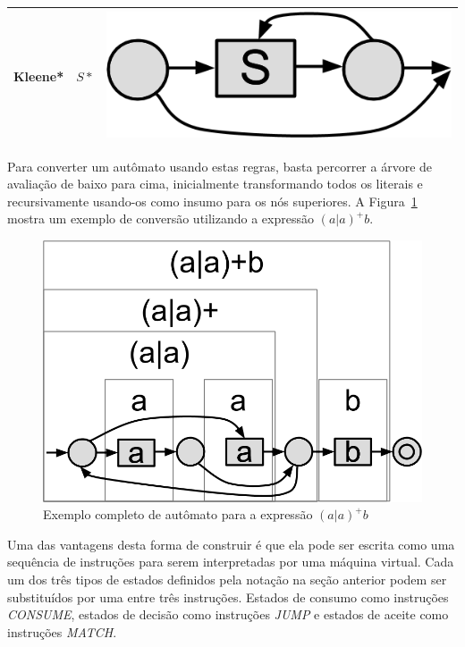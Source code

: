 \documentclass[a4paper,12pt,oneside,onecolumn]{uerj}
\begin{document}
\begin{center}
\begin{tabular}{ c | c | c }
		\hline
		Kleene* & $S*$ & \includegraphics[scale=0.25]{figures/thompson_kleene.png} \\ 
		\hline
	\end{tabular}
\end{center}

Para converter um autômato usando estas regras, basta percorrer a árvore de avaliação de baixo para cima, inicialmente transformando todos os literais e recursivamente usando-os como insumo para os nós superiores. A Figura~\ref{fig:exemplo_automato_completo} mostra um exemplo de conversão utilizando a expressão $(a|a)^+b$.

\begin{figure}[!htbp]
  \centering
  \includegraphics[scale=0.33]{figures/exemplo_automato_completo.png}
  \caption{Exemplo completo de autômato para a expressão $(a|a)^+b$}
  \label{fig:exemplo_automato_completo}
\end{figure}

Uma das vantagens desta forma de construir é que ela pode ser escrita como uma sequência de instruções para serem interpretadas por uma máquina virtual. Cada um dos três tipos de estados definidos pela notação na seção anterior podem ser substituídos por uma entre três instruções. Estados de consumo como instruções \emph{CONSUME}, estados de decisão como instruções \emph{JUMP} e estados de aceite como instruções \emph{MATCH}.
\end{document}
